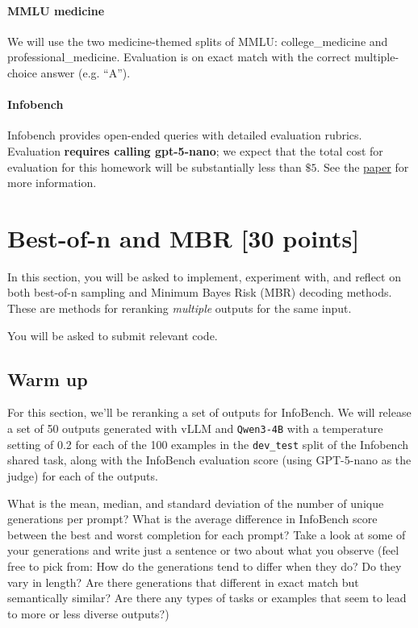 \documentclass{article}
\begin{document}
\paragraph{MMLU medicine} 

We will use the two medicine-themed splits of MMLU: college\_medicine and professional\_medicine. Evaluation is on exact match with the correct multiple-choice answer (e.g. ``A''). 
\paragraph{Infobench} 

Infobench provides open-ended queries with detailed evaluation rubrics. Evaluation \textbf{requires calling gpt-5-nano}; we expect that the total cost for evaluation for this homework will be substantially less than $\$5$. See the \href{https://arxiv.org/abs/2401.03601}{paper} for more information.

\clearpage


\section{Best-of-n and MBR [30 points]} 
In this section, you will be asked to implement, experiment with, and reflect on both best-of-n sampling \cite{beirami2025theoreticalguaranteesbestofn, ichihara2025evaluationbestofn} and Minimum Bayes Risk (MBR) decoding \cite{bickel-doksum-1977, eikema-aziz-2020-is} methods. These are methods for reranking \textit{multiple} outputs for the same input.

You will be asked to submit relevant code.

\subsection{Warm up}
For this section, we'll be reranking a set of outputs for InfoBench. We will release a set of 50 outputs generated with vLLM and \texttt{Qwen3-4B} with a temperature setting of 0.2 for each of the 100 examples in the \texttt{dev\_test} split of the Infobench shared task, along with the InfoBench evaluation score  (using GPT-5-nano as the judge) for each of the outputs.

What is the mean, median, and standard deviation of the number of unique generations per prompt? What is the average difference in InfoBench score between the best and worst completion for each prompt? Take a look at some of your generations and write just a sentence or two about what you observe (feel free to pick from: How do the generations tend to differ when they do? Do they vary in length? Are there generations that different in exact match but semantically similar? Are there any types of tasks or examples that seem to lead to more or less diverse outputs?)
\end{document}
